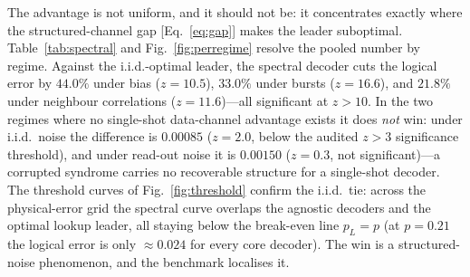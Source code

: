 \documentclass[reprint,aps,prxquantum,amsmath,amssymb,floatfix,nofootinbib,longbibliography]{revtex4-2}
\theoremstyle{definition}
\theoremstyle{remark}
\theoremstyle{plain}
\newcommand{\sync}[1]{#1}
\begin{document}
The advantage is not uniform, and it should not be: it concentrates exactly where the structured-channel gap [Eq.~\eqref{eq:gap}] makes the leader suboptimal. Table~\ref{tab:spectral} and Fig.~\ref{fig:perregime} resolve the pooled number by regime. Against the i.i.d.-optimal leader, the spectral decoder cuts the logical error by $\sync{44.0}\%$ under bias ($z=\sync{10.5}$), $\sync{33.0}\%$ under bursts ($z=\sync{16.6}$), and $\sync{21.8}\%$ under neighbour correlations ($z=\sync{11.6}$)---all significant at $z>10$. In the two regimes where no single-shot data-channel advantage exists it does \emph{not} win: under i.i.d.\ noise the difference is $\sync{0.00085}$ ($z=\sync{2.0}$, below the audited $z>3$ significance threshold), and under read-out noise it is $\sync{0.00150}$ ($z=\sync{0.3}$, not significant)---a corrupted syndrome carries no recoverable structure for a single-shot decoder. The threshold curves of Fig.~\ref{fig:threshold} confirm the i.i.d.\ tie: across the physical-error grid the spectral curve overlaps the agnostic decoders and the optimal lookup leader, all staying below the break-even line $p_L=p$ (at $p=\sync{0.21}$ the logical error is only $\approx\sync{0.024}$ for every core decoder). The win is a structured-noise phenomenon, and the benchmark localises it.

\begin{table}[tb]
    \centering
    \caption{\textbf{Headline decoder comparison: the spectral decoder breaks the tie.} Repetition code at $p=0.12$, pooled over the five structured-noise regimes (distance $9$, $20{,}000$ trials per regime, $n=100{,}000$ shots per decoder; reported scale). Columns: logical error rate, its $\pm$95\% confidence interval, and expected calibration error (ECE). Rows are sorted by logical error rate; $\star$ marks the lowest. The eight structure-agnostic decoders are mutually indistinguishable (spread $0.0033$, below $1.5$ interval widths), whereas the channel-adaptive \texttt{spectral} decoder is lower by $\approx\!10$ interval widths. ECE spans a factor of nearly six across the agnostic family and is uncorrelated with accuracy; the spectral decoder's pooled ECE is competitive but inflated by the read-out regime (Table~\ref{tab:ed_ece}). Generated verbatim from \texttt{summary.json}.}
    \label{tab:main}
    
\end{table}
\end{document}
